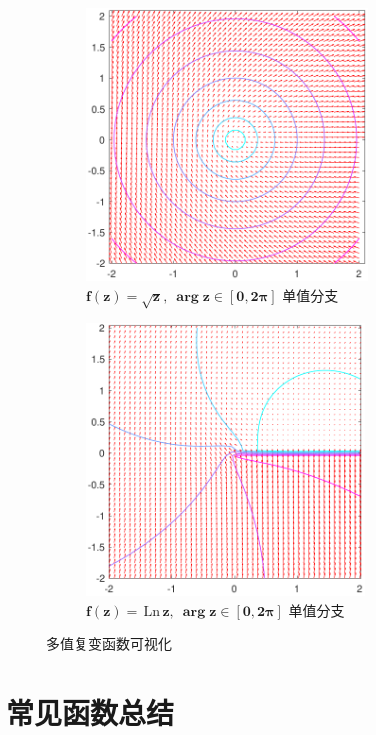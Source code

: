 \documentclass[UTF8]{report}
\def\Ln{\mathrm{\,Ln\,}}
\theoremstyle{MyLineTheoremStyle} %
\theoremstyle{MyBlockTheoremStyle} %
\theoremstyle{MySubsubsectionStyle} %
\begin{document}
\begin{figure}[H]\centering
    \begin{subfigure}[t]{0.49\textwidth}\centering
        \includegraphics[height=205pt]{assets/1,2/sqrt z.pdf}
        \caption{ $\boldsymbol{f(z) = \sqrt{z} },\ \boldsymbol{\arg z \in [0, 2\pi]}$ 单值分支 }
    \end{subfigure}\begin{subfigure}[t]{0.49\textwidth}\centering
        \includegraphics[height=205pt]{assets/1,2/ln z.pdf}
        \caption{ $\boldsymbol{f(z) = \Ln z},\ \boldsymbol{\arg z \in [0, 2\pi]}$ 单值分支  }
    \end{subfigure}
    \caption{ 多值复变函数可视化 }\label{可视化4}
\end{figure}

\section{常见函数总结}
\end{document}
